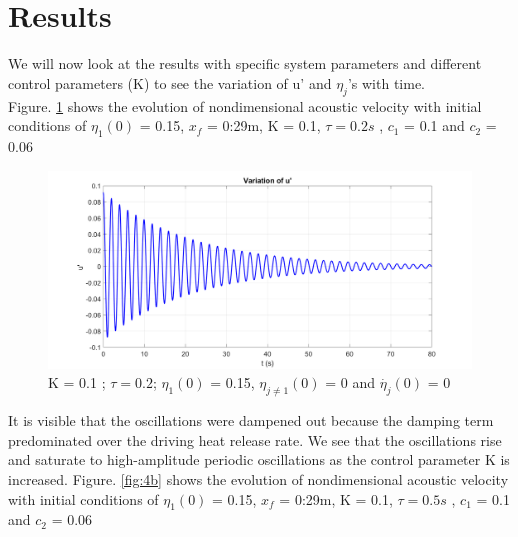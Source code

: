\documentclass[8pt]{article} %
\begin{document}
\section{Results}
We will now look at the results with specific system parameters and different control parameters (K) to see the variation of u' and $\eta_j$'s with time.\\
Figure. \ref{fig:4a} shows the evolution of nondimensional acoustic velocity with initial conditions of $\eta_1 (0)$ = 0.15, $x_f$ = 0:29m, K = 0.1, $\tau = 0.2s$ , $c_1$ = 0.1 and $c_2$ = 0.06 
\begin{figure}[H]
  \centering
  \begin{minipage}[b]{0.5\linewidth}
    \centering
    \includegraphics[width=\linewidth]{fig4a-k=0.1-tau=0.2}
   \caption{K = 0.1 ; $\tau = 0.2$; $\eta_1 (0)$ = 0.15, $\eta_{j\neq 1} (0)$ = 0 and $\dot{\eta_j} (0)$ = 0}
    \label{fig:4a}
  \end{minipage}
  \hfill
\end{figure}
It is visible that the oscillations were dampened out because the damping term predominated over the driving heat release rate. We see that the oscillations rise and saturate to high-amplitude periodic oscillations as the control parameter K is increased. Figure. \ref{fig:4b} shows the evolution of nondimensional acoustic velocity with initial conditions of $\eta_1 (0)$ = 0.15, $x_f$ = 0:29m, K = 0.1, $\tau = 0.5s$ , $c_1$ = 0.1 and $c_2$ = 0.06 
\end{document}
